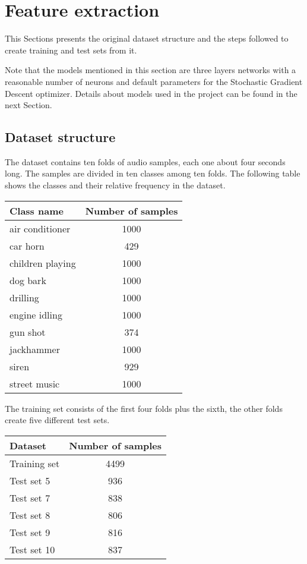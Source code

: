 \section{Feature extraction}
\label{feature-extraction}

This Sections presents the original dataset structure and the 
steps followed to create training and test sets from it.

Note that the models mentioned in this section are
three layers networks with a reasonable number of neurons 
and default parameters for the Stochastic Gradient 
Descent optimizer. 
Details about models used in the project can be found 
in the next Section.

\subsection{Dataset structure}
\label{dataset-structure}

The dataset contains ten folds of audio samples, each one about 
four seconds long. The samples are divided in ten classes among ten 
folds. The following table shows the classes and their relative frequency 
in the dataset.

\begin{center}
    \begin{tabular}{ |l|c| } 
        \hline
        Class name & Number of samples \\
        \hline
        air conditioner & 1000 \\
        car horn & 429 \\
        children playing & 1000 \\
        dog bark & 1000 \\
        drilling & 1000 \\
        engine idling & 1000 \\
        gun shot & 374 \\
        jackhammer & 1000 \\
        siren & 929 \\
        street music & 1000 \\
        \hline
    \end{tabular}
\end{center}

The training set consists of the first four folds plus the sixth, 
the other folds create five different test sets.

\begin{center}
    \begin{tabular}{ |l|c| } 
        \hline
        Dataset & Number of samples \\
        \hline
        Training set & 4499 \\
        Test set 5 & 936 \\
        Test set 7 & 838 \\
        Test set 8 & 806 \\
        Test set 9 & 816 \\
        Test set 10 & 837 \\
        \hline
    \end{tabular}
\end{center}

